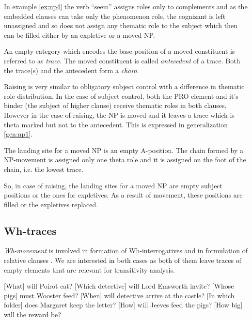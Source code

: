 In example \ref{ex:np4} the verb ``seem'' assigns roles only to complements and as the embedded clauses can take only the phenomenon role, the cognizant is left unassigned and so does not assign any thematic role to the subject which then can be filled either by an expletive or a moved NP. 

\begin{definition}\label{def:trace}
	An empty category which encodes the base position of a moved constituent is referred to as \textit{trace}. The moved constituent is called \textit{antecedent} of a trace. Both the trace(s) and the antecedent form a \textit{chain}.
\end{definition}

Raising is very similar to obligatory subject control with a difference in thematic role distribution. In the case of subject control, both the PRO element and it's binder (the subject of higher clause) receive thematic roles in both clauses. However in the case of raising, the NP is moved and it leaves a trace which is theta marked but not to the antecedent. This is expressed in generalization \ref{gen:np1}. 

\begin{generalization}\label{gen:np1} 
	The landing site for a moved NP is an empty A-position. The chain formed by a NP-movement is assigned only one theta role and it is assigned on the foot of the chain, i.e. the lowest trace. \citep[p.~314]{Haegeman1991} 
\end{generalization} 

So, in case of raising, the landing sites for a moved NP are empty subject positions or the ones for expletives. As a result of movement, these positions are filled or the expletives replaced.

\subsection{Wh-traces}
\label{sec:wh-gbt}
\textit{Wh-movement} is involved in formation of Wh-interrogatives and in formulation of relative clauses \cite[p.~423]{Haegeman1991}. We are interested in both cases as both of them leave traces of empty elements that are relevant for transitivity analysis. 

\begin{exe}
	\ex\label{ex:wh1} [What] will Poirot eat?
	\ex\label{ex:wh2} [Which detective] will Lord Emsworth invite?
	\ex\label{ex:wh3} [Whose pigs] must Wooster feed?
	\ex\label{ex:wh4} [When] will detective arrive at the castle?
	\ex\label{ex:wh5} [In which folder] does Margaret keep the letter?
	\ex\label{ex:wh6} [How] will Jeeves feed the pigs? 
	\ex\label{ex:wh7} [How big] will the reward be?
\end{exe}

